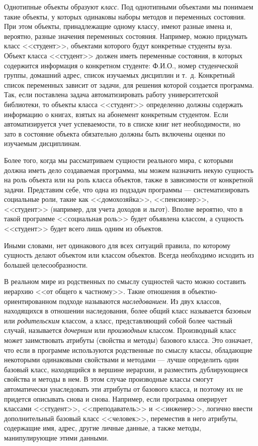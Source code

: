 Однотипные объекты образуют \emph{класс}. Под однотипными объектами мы понимаем такие объекты,
у которых одинаковы наборы методов и переменных состояния. При этом объекты, принадлежащие одному классу, имеют разные
имена и, вероятно, разные значения переменных состояния. Например, можно придумать класс <<студент>>, объектами которого
будут конкретные студенты вуза. Объект класса <<студент>> должен иметь переменные состояния, в которых содержится
информация о конкретном студенте: Ф.И.О., номер студенческой группы, домашний адрес, список изучаемых дисциплин и т.~д.
Конкретный список переменных зависит от задачи, для решения которой создается программа. Так, если поставлена задача
автоматизировать работу университетской библиотеки, то объекты класса <<студент>> определенно должны содержать информацию
о книгах, взятых на абонемент конкретным студентом. Если автоматизируется учет успеваемости, то в списке книг нет
необходимости, но зато в состояние объекта обязательно должны быть включены оценки по изучаемым дисциплинам.

Более того, когда мы рассматриваем сущности реального мира, с которыми должна иметь дело создаваемая программа, мы можем
назначить некую сущность на роль объекта или на роль класса объектов, также в зависимости от конкретной задачи.
Представим себе, что одна из подзадач программы --- систематизировать социальные роли, такие как <<домохозяйка>>,
<<пенсионер>>, <<студент>> (например, для учета доходов и льгот). Вполне вероятно, что в такой программе <<социальная роль>>
будет объявлена классом, а сущность <<студент>> будет всего лишь одним из объектов. 

Иными словами, нет одинакового для всех ситуаций правила, по которому сущность делают объектом или классом объектов.
Всегда необходимо исходить из большей целесообразности. 

В реальном мире из родственных по смыслу сущностей часто можно составить иерархию <<от общего к частному>>. Такие
отношения в объектно-ориентированном подходе называются
\emph{наследованием}. Из двух классов,
находящихся в отношении наследования, более общий класс называется
\emph{базовым} или
\emph{родительским} классом, а класс, представляющий собой более
частный случай, называется \emph{дочерним} или
\emph{производным} классом. Производный класс может заимствовать
атрибуты (свойства и методы) базового класса. Это означает, что если в программе используются родственные по смыслу
классы, обладающие некоторыми одинаковыми свойствами и методами --- лучше определить один базовый класс, находящийся в
вершине иерархии, и разместить дублирующиеся свойства и методы в нем. В этом случае производные классы смогут
автоматически унаследовать эти атрибуты от базового класса, и поэтому их не придется описывать снова и снова. Например,
если программа оперирует классами <<студент>>, <<преподаватель>> и <<инженер>>, логично ввести дополнительный базовый класс
<<человек>>, переместив в него атрибуты, содержащие имя, адрес, другие личные данные, а также методы, манипулирующие
этими данными.

